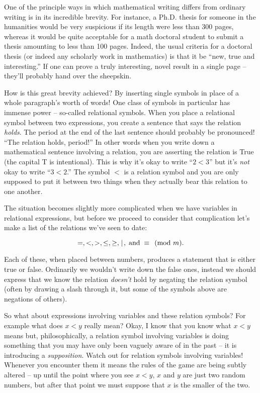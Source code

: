 One of the principle ways in which mathematical writing
differs from ordinary writing is in its incredible brevity.  For
instance, a Ph.D. thesis for someone in the humanities would be very 
suspicious if its length were less than 300 pages, whereas it would
be quite acceptable for a math doctoral student to submit a thesis
amounting to less than 100 pages.  Indeed, the usual criteria for
a doctoral thesis (or indeed any scholarly work in mathematics) is
that it be ``new, true and interesting.''  If one can prove a truly 
interesting, novel result in a single page -- they'll probably hand over 
the sheepskin.

How is this great brevity achieved?  By inserting single symbols in place
of a whole paragraph's worth of words!  One class of symbols in particular
has immense power -- so-called  relational symbols.  
When you place a relational
symbol between two expressions, you create a sentence that says the
relation \emph{holds}.  The period at the end of the last sentence should
probably be pronounced!  ``The relation holds, period!''  In other words
when you write down a mathematical sentence involving a relation, you 
are asserting the relation is True (the capital T is intentional).
This is why it's okay to write ``$2 < 3$'' but it's \emph{not} okay to
write ``$3 < 2$.''  The symbol $<$ is a relation symbol and you are
only supposed to put it between two things when they actually bear this
relation to one another.

The situation becomes slightly more complicated when we have 
variables in relational expressions, but before we proceed to
consider that complication let's make a list of the relations
we've seen to date:

\[ =, <, >, \leq, \geq,\; \!\mid\! \; , \; \mbox{and} \; \equiv \pmod{m}. \] 

Each of these, when placed between numbers, produces a statement that
is either true or false.  Ordinarily we wouldn't write down the 
false ones, instead we should express that we know the relation
\emph{doesn't} hold by negating the relation symbol (often by
drawing a slash through it, but some of the symbols above are
negations of others).

So what about expressions involving variables and these relation symbols?
For example what does $x < y$ really mean?  Okay, I know that you know 
what $x < y$ means but, philosophically, a relation symbol involving variables
is doing something that you may have only been vaguely aware of in the 
past -- it is introducing a \emph{supposition}.  Watch out for relation
symbols involving variables!  Whenever you encounter them it means the 
rules of the game are being subtly altered -- up until the point where 
you see $x < y$, $x$ and $y$ are just two random numbers, but after that
point we must suppose that $x$ is the smaller of the two.

